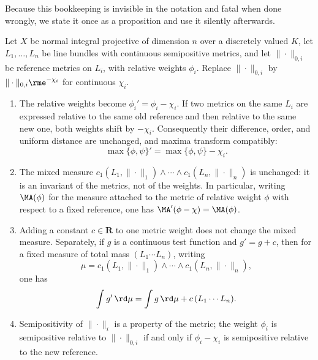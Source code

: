 Because this bookkeeping is invisible in the notation and fatal when done
wrongly, we state it once as a proposition and use it silently afterwards.

\begin{proposition}
\label{prop:metrics-change-of-reference}
Let $X$ be normal integral projective of dimension $n$ over a discretely valued
$K$, let $L_1,\ldots,L_n$ be line bundles with continuous semipositive
metrics, and let $\|\cdot\|_{0,i}$ be reference metrics on $L_i$, with
relative weights $\phi_i$. Replace $\|\cdot\|_{0,i}$ by
$\|\cdot\|_{0,i}\rme^{-\chi_i}$ for continuous $\chi_i$.
\begin{enumerate}
\item The relative weights become $\phi_i'=\phi_i-\chi_i$. If two metrics
on the same $L_i$ are expressed relative to the same old reference and
then relative to the same new one, both weights shift by $-\chi_i$.
Consequently their difference, order, and uniform distance are unchanged,
and maxima transform compatibly:
\[
 \max\{\phi,\psi\}'=\max\{\phi,\psi\}-\chi_i.
\]
\item The mixed measure
$c_1(L_1,\|\cdot\|_1)\wedge\cdots\wedge c_1(L_n,\|\cdot\|_n)$ is
unchanged: it is an invariant of the metrics, not of the weights. In
particular, writing $\MA(\phi)$ for the measure attached to the metric of
relative weight $\phi$ with respect to a fixed reference, one has
$\MA'(\phi-\chi)=\MA(\phi)$.
\item Adding a constant $c\in\mathbf R$ to one metric weight does not
change the mixed measure. Separately, if $g$ is a continuous test function
and $g'=g+c$, then for a fixed measure of total mass
$(L_1\cdots L_n)$, writing
\[
 \mu=c_1(L_1,\|\cdot\|_1)\wedge\cdots\wedge
       c_1(L_n,\|\cdot\|_n),
\]
one has
\[
 \int g'\,\rd\mu=\int g\,\rd\mu+c\,(L_1\cdots L_n).
\]
\item Semipositivity of $\|\cdot\|_i$ is a property of the metric; the
weight $\phi_i$ is semipositive relative to $\|\cdot\|_{0,i}$ if and only
if $\phi_i-\chi_i$ is semipositive relative to the new reference.
\end{enumerate}
\end{proposition}

